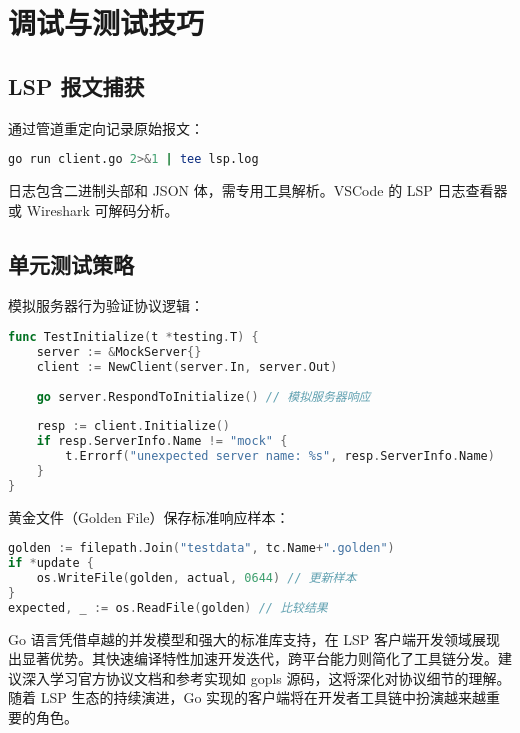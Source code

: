 \chapter{调试与测试技巧}
\section{LSP 报文捕获}
通过管道重定向记录原始报文：\par
\begin{lstlisting}[language=bash]
go run client.go 2>&1 | tee lsp.log
\end{lstlisting}
日志包含二进制头部和 JSON 体，需专用工具解析。VSCode 的 LSP 日志查看器或 Wireshark 可解码分析。\par
\section{单元测试策略}
模拟服务器行为验证协议逻辑：\par
\begin{lstlisting}[language=go]
func TestInitialize(t *testing.T) {
    server := &MockServer{}
    client := NewClient(server.In, server.Out)
    
    go server.RespondToInitialize() // 模拟服务器响应
    
    resp := client.Initialize()
    if resp.ServerInfo.Name != "mock" {
        t.Errorf("unexpected server name: %s", resp.ServerInfo.Name)
    }
}
\end{lstlisting}
黄金文件（Golden File）保存标准响应样本：\par
\begin{lstlisting}[language=go]
golden := filepath.Join("testdata", tc.Name+".golden")
if *update {
    os.WriteFile(golden, actual, 0644) // 更新样本
}
expected, _ := os.ReadFile(golden) // 比较结果
\end{lstlisting}
Go 语言凭借卓越的并发模型和强大的标准库支持，在 LSP 客户端开发领域展现出显著优势。其快速编译特性加速开发迭代，跨平台能力则简化了工具链分发。建议深入学习官方协议文档和参考实现如 gopls 源码，这将深化对协议细节的理解。随着 LSP 生态的持续演进，Go 实现的客户端将在开发者工具链中扮演越来越重要的角色。\par
